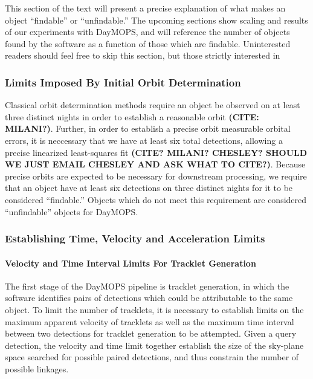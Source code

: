 \documentclass[12pt,preprint]{aastex}
\begin{document}
This section of the text will present a precise explanation of what
makes an object ``findable'' or ``unfindable.'' The upcoming sections
show scaling and results of our experiments with DayMOPS, and will
reference the number of objects found by the software as a function of
those which are findable.  Uninterested readers should feel free to
skip this section, but those strictly interested in 


\subsubsection{Limits Imposed By Initial Orbit Determination}

Classical orbit determination methods require an object be observed on
at least three distinct nights in order to establish a reasonable
orbit \textbf{(CITE: MILANI?)}.  Further, in order to establish a
precise orbit measurable orbital errors, it is neccessary that we have
at least six total detections, allowing a precise linearized
least-squares fit \textbf{(CITE? MILANI? CHESLEY? SHOULD WE JUST EMAIL
  CHESLEY AND ASK WHAT TO CITE?)}.  Because precise orbits are expected to be
necessary for downstream processing, we require that an object have at
least six detections on three distinct nights for it to be considered
``findable.''  Objects which do not meet this requirement are
considered ``unfindable'' objects for DayMOPS.

\subsubsection{Establishing Time, Velocity and Acceleration Limits}



\paragraph{Velocity and Time Interval Limits For Tracklet Generation}

The first stage of the DayMOPS pipeline is tracklet generation, in
which the software identifies pairs of detections which could be
attributable to the same object.  To limit the number of tracklets, it
is necessary to establish limits on the maximum apparent velocity of
tracklets as well as the maximum time interval between two detections
for tracklet generation to be attempted.  Given a query detection, the
velocity and time limit together establish the size of the sky-plane
space searched for possible paired detections, and thus constrain the
number of possible linkages.
\end{document}
